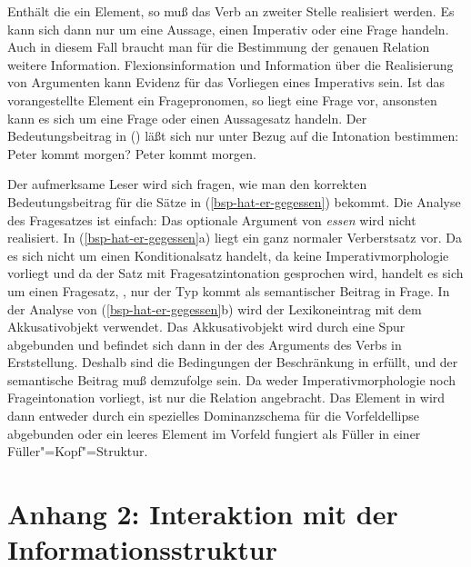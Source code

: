 Enthält die \slashl ein Element, so muß das Verb an zweiter Stelle realisiert werden.
Es kann sich dann nur um eine Aussage, einen Imperativ oder eine Frage handeln. Auch in diesem
Fall braucht man für die Bestimmung der genauen Relation weitere Information. Flexionsinformation
und Information über die Realisierung von Argumenten kann Evidenz für das Vorliegen eines
Imperativs sein. Ist das vorangestellte Element ein Fragepronomen, so liegt eine Frage vor,
ansonsten kann es sich um eine Frage oder einen Aussagesatz handeln. Der Bedeutungsbeitrag in ()
läßt sich nur unter Bezug auf die Intonation bestimmen:
\eal
\ex Peter kommt morgen?
\ex Peter kommt morgen.
\zl

\noindent
Der aufmerksame Leser wird sich fragen, wie man den korrekten Bedeutungsbeitrag für die Sätze in
(\ref{bsp-hat-er-gegessen}) bekommt. Die Analyse des Fragesatzes ist einfach: Das optionale Argument
von \emph{essen} wird nicht realisiert. In (\ref{bsp-hat-er-gegessen}a) liegt ein ganz normaler Verberstsatz
vor. Da es sich nicht um einen Konditionalsatz handelt, da keine Imperativmorphologie vorliegt
und da der Satz mit Fragesatzintonation gesprochen wird, handelt es sich um einen Fragesatz,
\dash, nur der Typ  kommt als semantischer Beitrag in Frage. In der Analyse von
(\ref{bsp-hat-er-gegessen}b) wird der Lexikoneintrag mit dem Akkusativobjekt verwendet. Das Akkusativobjekt
wird durch eine Spur abgebunden und befindet sich dann in der \slashl des Arguments des Verbs
in Erststellung. Deshalb sind die Bedingungen der Beschränkung in  erfüllt, und
der semantische Beitrag muß demzufolge  sein.
Da weder Imperativmorphologie noch Frageintonation vorliegt, ist nur die Relation 
angebracht. Das Element in \slasch wird dann entweder durch ein spezielles Dominanzschema für
die Vorfeldellipse abgebunden \citep{Mueller2004e} oder ein leeres Element im Vorfeld fungiert als Füller in einer 
Füller"=Kopf"=Struktur.



\section{Anhang 2: Interaktion mit der Informationsstruktur}
\label{sec-udc-is}

